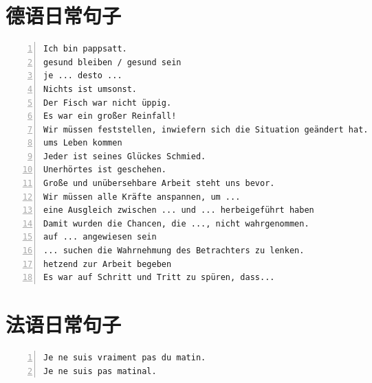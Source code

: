 \documentclass[11pt]{amsart}
\begin{document}
\section{德语日常句子}
\begin{lstlisting}[numbers=left,numberstyle=\tiny,numbersep=10pt]
Ich bin pappsatt.
gesund bleiben / gesund sein
je ... desto ...
Nichts ist umsonst.
Der Fisch war nicht üppig.
Es war ein großer Reinfall!
Wir müssen feststellen, inwiefern sich die Situation geändert hat.
ums Leben kommen
Jeder ist seines Glückes Schmied.
Unerhörtes ist geschehen.
Große und unübersehbare Arbeit steht uns bevor.
Wir müssen alle Kräfte anspannen, um ...
eine Ausgleich zwischen ... und ... herbeigeführt haben
Damit wurden die Chancen, die ..., nicht wahrgenommen.
auf ... angewiesen sein
... suchen die Wahrnehmung des Betrachters zu lenken.
hetzend zur Arbeit begeben
Es war auf Schritt und Tritt zu spüren, dass...
\end{lstlisting}

\section{法语日常句子}
\begin{lstlisting}[numbers=left,numberstyle=\tiny,numbersep=10pt]
Je ne suis vraiment pas du matin.
Je ne suis pas matinal.
\end{lstlisting}

 
   



 








\begin{thebibliography}{99}

 


  

\end{thebibliography}
\end{document}
